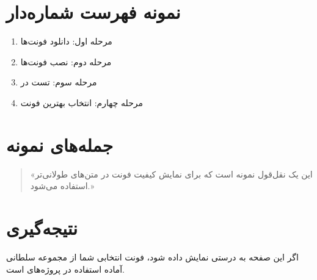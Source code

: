 \documentclass[12pt,a4paper]{article}
\begin{document}
\section{نمونه فهرست شماره‌دار}
\begin{enumerate}
\item مرحله اول: دانلود فونت‌ها
\item مرحله دوم: نصب فونت‌ها
\item مرحله سوم: تست در 
\item مرحله چهارم: انتخاب بهترین فونت
\end{enumerate}

\section{جمله‌های نمونه}
\begin{quote}
«این یک نقل‌قول نمونه است که برای نمایش کیفیت فونت در متن‌های طولانی‌تر استفاده می‌شود.»
\end{quote}

\section{نتیجه‌گیری}
اگر این صفحه به درستی نمایش داده شود، فونت انتخابی شما از مجموعه سلطانی آماده استفاده در پروژه‌های  است.
\end{document}
